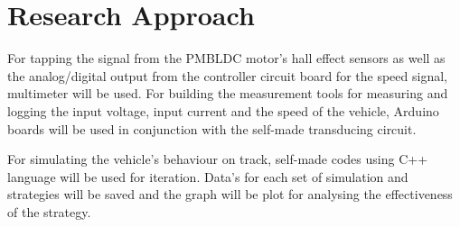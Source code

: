 \section{Research Approach}

For tapping the signal from the PMBLDC motor's hall effect sensors as well as the analog/digital output from the controller circuit board for the speed signal, multimeter will be used. For building the measurement tools for measuring and logging the input voltage, input current and the speed of the vehicle, Arduino boards will be used in conjunction with the self-made transducing circuit.

For simulating the vehicle's behaviour on track, self-made codes using C++ language will be used for iteration. Data's for each set of simulation and strategies will be saved and the graph will be plot for analysing the effectiveness of the strategy.
